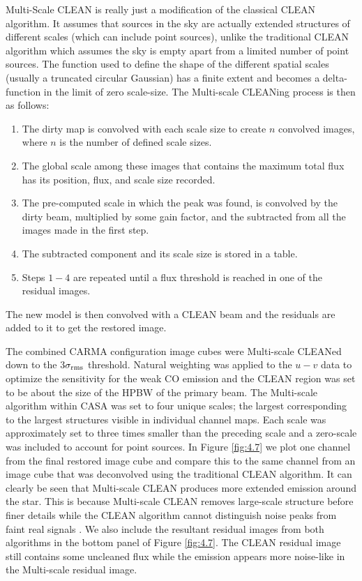 Multi-Scale CLEAN is really just a modification of the classical CLEAN algorithm. It assumes that sources in the sky are actually extended structures of different scales (which can include point sources), unlike the traditional CLEAN algorithm which assumes the sky is empty apart from a limited number of point sources. The function used to define the shape of the different spatial scales (usually a truncated circular Gaussian) has a finite extent and becomes a delta-function in the limit of zero scale-size. The Multi-scale CLEANing process is then as follows:
\begin{enumerate}
\item The dirty map is convolved with each scale size to create $n$ convolved images, where $n$ is the number of defined scale sizes.
\item The global scale among these images that contains the maximum total flux has its position, flux, and scale size recorded.
\item The pre-computed scale in which the peak was found, is convolved by the dirty beam, multiplied by some gain factor, and the subtracted from all the images made in the first step.
\item The subtracted component and its scale size is stored in a table.
\item Steps $1-4$ are repeated until a flux threshold is reached in one of the residual images.
\end{enumerate}
The new model is then convolved with a CLEAN beam and the residuals are added to it to get the restored image.

The combined CARMA configuration image cubes were Multi-scale CLEANed down to the 3$\sigma _{\rm{rms}}$ threshold. Natural weighting was applied to the $u-v$ data to optimize the sensitivity for the weak CO emission and the CLEAN region was set to be about the size of the HPBW of the primary beam. The Multi-scale algorithm  within CASA was set to four unique scales; the largest corresponding to the largest structures visible in individual channel maps. Each scale was approximately set to three times smaller than the preceding scale and a zero-scale was included to account for point sources. In Figure \ref{fig:4.7} we plot one channel from the final restored image cube and compare this to the same channel from an image cube that was deconvolved using the traditional CLEAN algorithm. It can clearly be seen that Multi-scale CLEAN produces more extended emission around the star. This is because Multi-scale CLEAN removes large-scale structure before finer details while the CLEAN algorithm cannot distinguish noise peaks from faint real signals \citep{rich_2008}. We also include the resultant residual images from both algorithms in the bottom panel of Figure \ref{fig:4.7}. The CLEAN residual image still contains some uncleaned flux while the emission appears more noise-like in the Multi-scale residual image.